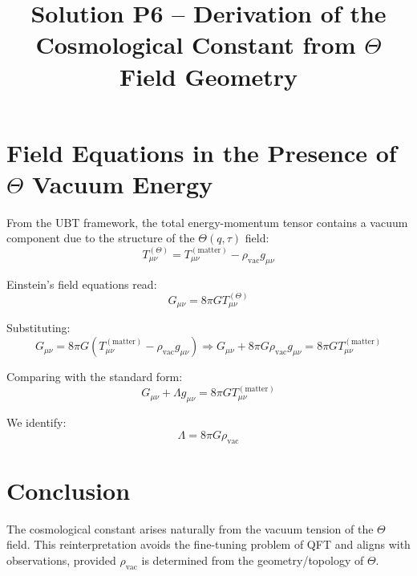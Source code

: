 \documentclass[12pt]{article}
\title{Solution P6 – Derivation of the Cosmological Constant from $\Theta$ Field Geometry}
\author{}
\date{}
\begin{document}
\maketitle

\section*{Field Equations in the Presence of $\Theta$ Vacuum Energy}

From the UBT framework, the total energy-momentum tensor contains a vacuum component due to the structure of the $\Theta(q,\tau)$ field:
\[
T_{\mu\nu}^{(\Theta)} = T_{\mu\nu}^{(\text{matter})} - \rho_{\text{vac}} g_{\mu\nu}
\]

Einstein's field equations read:
\[
G_{\mu\nu} = 8\pi G T_{\mu\nu}^{(\Theta)}
\]

Substituting:
\[
G_{\mu\nu} = 8\pi G \left( T_{\mu\nu}^{(\text{matter})} - \rho_{\text{vac}} g_{\mu\nu} \right)
\Rightarrow G_{\mu\nu} + 8\pi G \rho_{\text{vac}} g_{\mu\nu} = 8\pi G T_{\mu\nu}^{(\text{matter})}
\]

Comparing with the standard form:
\[
G_{\mu\nu} + \Lambda g_{\mu\nu} = 8\pi G T_{\mu\nu}^{(\text{matter})}
\]

We identify:
\[
\Lambda = 8\pi G \rho_{\text{vac}}
\]

\section*{Conclusion}

The cosmological constant arises naturally from the vacuum tension of the $\Theta$ field. This reinterpretation avoids the fine-tuning problem of QFT and aligns with observations, provided $\rho_{\text{vac}}$ is determined from the geometry/topology of $\Theta$.
\end{document}

